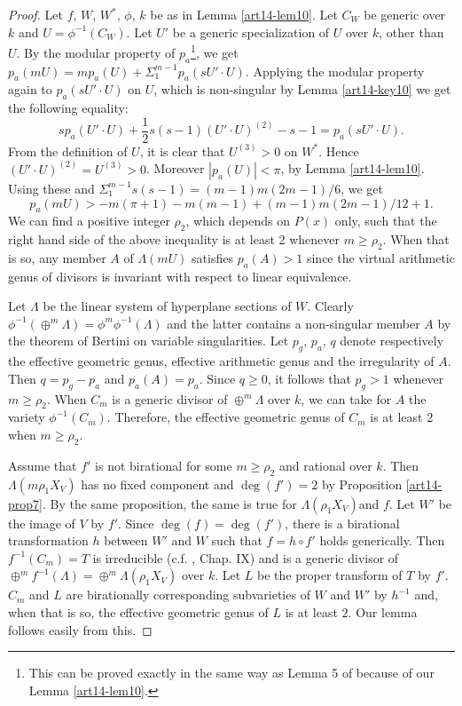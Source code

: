 \begin{proof}
Let $f$, $W$, $W^{*}$, $\phi$, $k$ be as in Lemma \ref{art14-lem10}. Let $C_{W}$ be generic over $k$ and $U=\phi^{-1}(C_{W})$. Let $U'$ be a generic specialization of $U$ over $k$, other than $U$. By the modular property of $p_{a}$\footnote{This can be proved exactly in the same way as Lemma 5 of \cite{art14-key31} because of our Lemma \ref{art14-lem10}.}, we get $p_{a}(mU)=mp_{a}(U)+\Sigma^{m-1}_{1}p_{a}(sU'\cdot U)$. Applying the modular property again to $p_{a}(sU'\cdot U)$ on $U$, which is non-singular by Lemma \ref{art14-key10} we get the following equality:
$$
sp_{a}(U'\cdot U)+\frac{1}{2}s(s-1)(U'\cdot U)^{(2)}-s-1=p_{a}(sU'\cdot U).
$$
From the definition of $U$, it is clear that $U^{(3)}>0$ on $W^{*}$. Hence $(U'\cdot U)^{(2)}=U^{(3)}>0$. Moreover $|p_{a}(U)|<\pi$, by Lemma \ref{art14-lem10}. Using these and $\Sigma^{m-1}_{1}s(s-1)=(m-1)m(2m-1)/6$, we get
$$
p_{a}(mU)>-m(\pi+1)-m(m-1)+(m-1)m(2m-1)/12+1.
$$
We can find a positive integer $\rho_{2}$, which depends on $P(x)$ only, such that the right hand side of the above inequality is at least 2 whenever $m\geq \rho_{2}$. When that is so, any member $A$ of $\Lambda(mU)$ satisfies $p_{a}(A)>1$ since the virtual arithmetic genus of divisors is invariant with respect to linear equivalence.

Let $\Lambda$ be the linear system of hyperplane sections of $W$. Clearly $\phi^{-1}(\oplus^{m}\Lambda)=\phi^{m}\phi^{-1}(\Lambda)$ and the latter contains a non-singular member $A$ by the theorem of Bertini on variable singularities. Let $p_{g}$, $p_{a}$, $q$ denote respectively the effective geometric genus, effective arithmetic genus and the irregularity of $A$. Then $q=p_{g}-p_{a}$ and $p_{a}(A)=p_{a}$. Since $q\geq 0$, it follows that $p_{g}>1$ whenever $m\geq \rho_{2}$. When $C_{m}$ is a generic divisor of $\oplus^{m}\Lambda$ over $k$, we can take for $A$ the variety $\phi^{-1}(C_{m})$. Therefore, the effective geometric genus of $C_{m}$ is at least 2 when $m\geq \rho_{2}$.

Assume that $f'$ is not birational for some $m\geq \rho_{2}$ and rational over $k$. Then $\Lambda(m\rho_{1}X_{V})$ has no fixed component and $\deg(f')=2$ by Proposition \ref{art14-prop7}. By the same proposition, the same is true for $\Lambda(\rho_{1}X_{V})$\pageoriginale and $f$. Let $W'$ be the image of $V$ by $f'$. Since $\deg(f)=\deg(f')$, there is a birational transformation $h$ between $W'$ and $W$ such that $f=h\circ f'$ holds generically. Then $f^{-1}(C_{m})=T$ is irreducible (c.f. \cite{art14-key25}, Chap. IX) and is a generic divisor of $\oplus^{m}f^{-1}(\Lambda)=\oplus^{m}\Lambda(\rho_{1}X_{V})$ over $k$. Let $L$ be the proper transform of $T$ by $f'$. $C_{m}$ and $L$ are birationally corresponding subvarieties of $W$ and $W'$ by $h^{-1}$ and, when that is so, the effective geometric genus of $L$ is at least $2$. Our lemma follows easily from this.


\end{proof}
